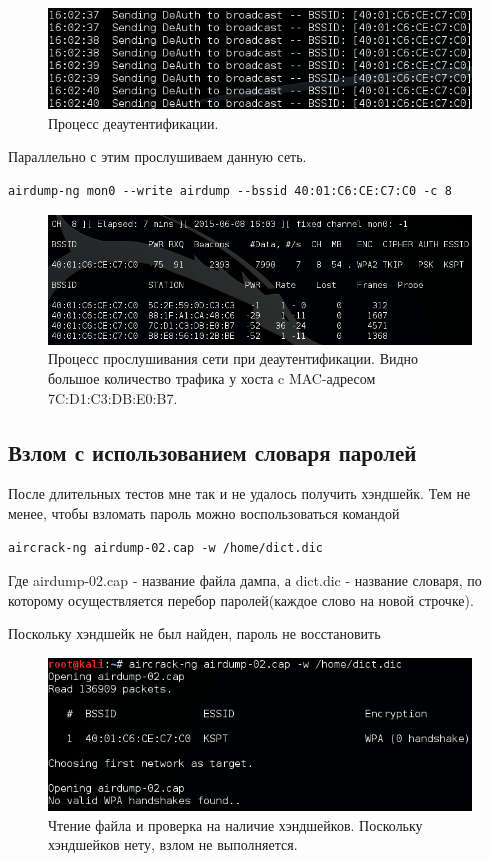 \documentclass[a4paper, 14pt]{article}				%
\begin{document}
\begin{figure}[h!]
\centering
\includegraphics[width=\textwidth]{rsrc/lab6_deauth}
\caption{Процесс деаутентификации.}
\end{figure}
\newpage
Параллельно с этим прослушиваем данную сеть.
\begin{Verbatim}[frame=single]
airdump-ng mon0 --write airdump --bssid 40:01:C6:CE:C7:C0 -c 8
\end{Verbatim}
\begin{figure}[h!]
\centering
\includegraphics[width=\textwidth]{rsrc/lab6_airodump_bssid_attack}
\caption{Процесс прослушивания сети при деаутентификации. Видно большое количество трафика у хоста c MAC-адресом 7C:D1:C3:DB:E0:B7.}
\end{figure}

\newpage
\subsection{Взлом с использованием словаря паролей}
После длительных тестов мне так и не удалось получить хэндшейк. Тем не менее, чтобы взломать пароль можно воспользоваться командой
\begin{Verbatim}[frame=single]
aircrack-ng airdump-02.cap -w /home/dict.dic
\end{Verbatim}
Где airdump-02.cap - название файла дампа, а dict.dic - название словаря, по которому осуществляется перебор паролей(каждое слово на новой строчке).

Поскольку хэндшейк не был найден, пароль не восстановить
\begin{figure}[h!]
\centering
\includegraphics[width=\textwidth]{rsrc/lab6_crack}
\caption{Чтение файла и проверка на наличие хэндшейков. Поскольку хэндшейков нету, взлом не выполняется.}
\end{figure}
\end{document}
